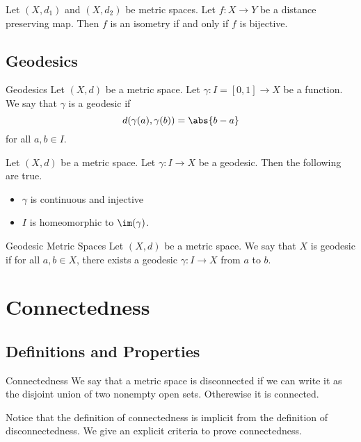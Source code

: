 \documentclass[a4paper]{article}
\begin{document}
\begin{lmm}{}{} Let $(X,d_1)$ and $(X,d_2)$ be metric spaces. Let $f:X\to Y$ be a distance preserving map. Then $f$ is an isometry if and only if $f$ is bijective. 
\end{lmm}

\subsection{Geodesics}
\begin{defn}{Geodesics}{} Let $(X,d)$ be a metric space. Let $\gamma:I=[0,1]\to X$ be a function. We say that $\gamma$ is a geodesic if $$d(\gamma(a),\gamma(b))=\abs{b-a}$$ for all $a,b\in I$. 
\end{defn}

\begin{prp}{}{} Let $(X,d)$ be a metric space. Let $\gamma:I\to X$ be a geodesic. Then the following are true. 
\begin{itemize}
\item $\gamma$ is continuous and injective
\item $I$ is homeomorphic to $\im(\gamma)$. 
\end{itemize}
\end{prp}

\begin{defn}{Geodesic Metric Spaces}{} Let $(X,d)$ be a metric space. We say that $X$ is geodesic if for all $a,b\in X$, there exists a geodesic $\gamma:I\to X$ from $a$ to $b$. 
\end{defn}

\pagebreak
\section{Connectedness}
\subsection{Definitions and Properties}
\begin{defn}{Connectedness}{} We say that a metric space is disconnected if we can write it as the disjoint union of two nonempty open sets. Otherewise it is connected. 
\end{defn}

Notice that the definition of connectedness is implicit from the definition of disconnectedness. We give an explicit criteria to prove connectedness. 
\end{document}

